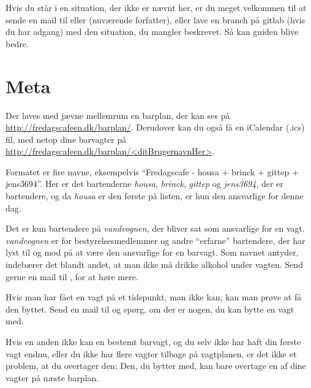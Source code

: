 Hvis du står i en situation, der ikke er nævnt her, er du meget
velkommen til at sende en mail til  eller
 (nuværende forfatter), eller lave en branch
på gitlab (hvis du har adgang) med den situation, du mangler
beskrevet. Så kan guiden blive bedre.

\section{Meta}
\label{sec:meta}

Der laves med jævne mellemrum en barplan, der kan ses på
\url{http://fredagscafeen.dk/barplan/}. Derudover kan du også få en
iCalendar (.ics) fil, med netop dine barvagter på
\url{http://fredagscafeen.dk/barplan/<ditBrugernavnHer>}.

Formatet er fire navne, eksempelvis ``Fredagscafe - housa + brinck +
gittep + jens3694''. Her er det bartenderne \emph{housa},
\emph{brinck}, \emph{gittep} og \emph{jens3694}, der er bartendere, og
da \emph{housa} er den første på listen, er hun den ansvarlige for
denne dag.

Det er kun bartendere på \emph{vandvognen}, der bliver sat som
ansvarlige for en vagt. \emph{vandvognen} er for bestyrelsesmedlemmer
og andre ``erfarne'' bartendere, der har lyst til og mod på at være
den ansvarlige for en barvagt. Som navnet antyder, indebærer det
blandt andet, at man ikke må drikke alkohol under vagten. Send gerne
en mail til , for at høre mere.

Hvis man har fået en vagt på et tidspunkt, man ikke kan, kan man prøve
at få den byttet. Send en mail til  og
spørg, om der er nogen, du kan bytte en vagt med.

Hvis en anden ikke kan en bestemt barvagt, og du selv ikke har haft
din første vagt endnu, eller du ikke har flere vagter tilbage på
vagtplanen, er det ikke et problem, at du overtager den: Den, du
bytter med, kan bare overtage en af dine vagter på næste barplan.



